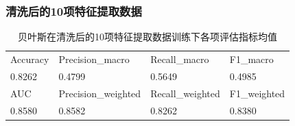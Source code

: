 \documentclass[10pt]{article}
\begin{document}
\subsubsection*{清洗后的10项特征提取数据}
\begin{table}[H]
  \centering
  \caption{贝叶斯在清洗后的10项特征提取数据训练下各项评估指标均值}
  \begin{tabular}{llll}
  \toprule
  Accuracy & Precision\_macro & Recall\_macro & F1\_macro \\
  0.8262 & 0.4799 & 0.5649 & 0.4985 \\
  \midrule
  AUC & Precision\_weighted & Recall\_weighted & F1\_weighted \\
  0.8580 & 0.8582 & 0.8262 & 0.8380 \\
  \bottomrule
  \end{tabular}
\end{table}
\end{document}
